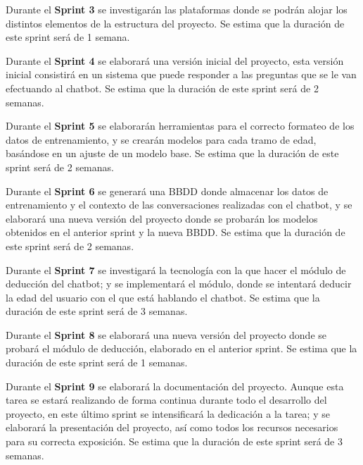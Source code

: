 Durante el \textbf{Sprint 3} se investigarán las plataformas donde se podrán alojar los distintos elementos de la estructura del proyecto. Se estima que la duración de este sprint será de 1 semana.

Durante el \textbf{Sprint 4} se elaborará una versión inicial del proyecto, esta versión inicial consistirá en un sistema que puede responder a las preguntas que se le van efectuando al chatbot. Se estima que la duración de este sprint será de 2 semanas.

Durante el \textbf{Sprint 5} se elaborarán herramientas para el correcto formateo de los datos de entrenamiento, y se crearán modelos para cada tramo de edad, basándose en un ajuste de un modelo base. Se estima que la duración de este sprint será de 2 semanas.

Durante el \textbf{Sprint 6} se generará una BBDD donde almacenar los datos de entrenamiento y el contexto de las conversaciones realizadas con el chatbot, y se elaborará una nueva versión del proyecto donde se probarán los modelos obtenidos en el anterior sprint y la nueva BBDD. Se estima que la duración de este sprint será de 2 semanas.

Durante el \textbf{Sprint 7} se investigará la tecnología con la que hacer el módulo de deducción del chatbot; y se implementará el módulo, donde se intentará deducir la edad del usuario con el que está hablando el chatbot. Se estima que la duración de este sprint será de 3 semanas.

Durante el \textbf{Sprint 8} se elaborará una nueva versión del proyecto donde se probará el módulo de deducción, elaborado en el anterior sprint. Se estima que la duración de este sprint será de 1 semanas.

Durante el \textbf{Sprint 9} se elaborará la documentación del proyecto. Aunque esta tarea se estará realizando de forma continua durante todo el desarrollo del proyecto, en este último sprint se intensificará la dedicación a la tarea; y se elaborará la presentación del proyecto, así como todos los recursos necesarios para su correcta exposición. Se estima que la duración de este sprint será de 3 semanas.



